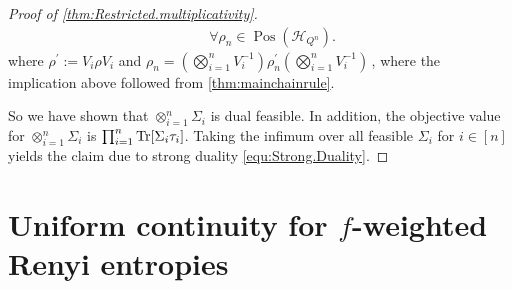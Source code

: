 \documentclass[11pt]{article}
\DeclareMathOperator{\Pos}{Pos}
\DeclareMathOperator{\id}{id}
\newcommand{\1}{\ensuremath{\mathbbm{1}}}
\theoremstyle{newdefinition}
\theoremstyle{newplain}
\theoremstyle{myplain}
\begin{document}
\begin{proof}[Proof of \cref{thm:Restricted.multiplicativity}]
\begin{align}
\quad &\forall \rho_n\in\Pos(\mathcal{H}_{Q^n}).
\end{align} where $\rho^\prime:=V_i\rho V_i$ and $\rho_n=(\bigotimes_{i=1}^nV_i^{-1})\rho^\prime_n(\bigotimes_{i=1}^nV_i^{-1})$\,, 
where the implication above followed from \cref{thm:mainchainrule}. 

So we have shown that  $\otimes_{i=1}^n \Sigma_i$ is dual feasible. In addition, the objective value for $\otimes_{i=1}^n \Sigma_i$ is $\prod_{i=1}^n \Tr[\Sigma_i \tau_i]$.
Taking the infimum over all feasible $\Sigma_i$ for $i\in[n]$ yields the claim due to strong duality \eqref{equ:Strong.Duality}.

\end{proof}

\section{Uniform continuity for $f$-weighted Renyi entropies}
\end{document}
